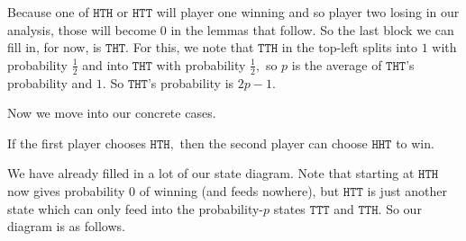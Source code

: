 Because one of $\texttt{HTH}$ or $\texttt{HTT}$ will player one winning and so player two losing in our analysis, those will become $0$ in the lemmas that follow. So the last block we can fill in, for now, is $\texttt{THT}.$ For this, we note that $\texttt{TTH}$ in the top-left splits into $1$ with probability $\frac12$ and into $\texttt{THT}$ with probability $\frac12,$ so $p$ is the average of $\texttt{THT}$'s probability and $1.$ So $\texttt{THT}$'s probability is $2p-1.$
\begin{center}
\end{center}
Now we move into our concrete cases.
\begin{lemma}
    If the first player chooses $\texttt{HTH},$ then the second player can choose $\texttt{HHT}$ to win.
\end{lemma}
We have already filled in a lot of our state diagram. Note that starting at $\texttt{HTH}$ now gives probability $0$ of winning (and feeds nowhere), but $\texttt{HTT}$ is just another state which can only feed into the probability-$p$ states $\texttt{TTT}$ and $\texttt{TTH}.$ So our diagram is as follows.
\begin{center}
\end{center}
